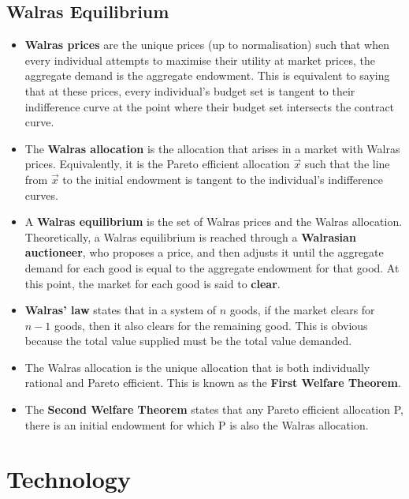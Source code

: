 \documentclass[a4paper]{article}
\begin{document}
\subsection{Walras Equilibrium}
\begin{itemize}
    \item \textbf{Walras prices} are the unique prices (up to normalisation) such that when every individual attempts to maximise their utility at market prices, the aggregate demand is the aggregate endowment. This is equivalent to saying that at these prices, every individual's budget set is tangent to their indifference curve at the point where their budget set intersects the contract curve.
    \item The \textbf{Walras allocation} is the allocation that arises in a market with Walras prices. Equivalently, it is the Pareto efficient allocation $\vec{x}$ such that the line from $\vec{x}$ to the initial endowment is tangent to the individual's indifference curves.
    \item A \textbf{Walras equilibrium} is the set of Walras prices and the Walras allocation. Theoretically, a Walras equilibrium is reached through a \textbf{Walrasian auctioneer}, who proposes a price, and then adjusts it until the aggregate demand for each good is equal to the aggregate endowment for that good. At this point, the market for each good is said to \textbf{clear}.
    \item \textbf{Walras' law} states that in a system of $n$ goods, if the market clears for $n-1$ goods, then it also clears for the remaining good. This is obvious because the total value supplied must be the total value demanded. 
    \item The Walras allocation is the unique allocation that is both individually rational and Pareto efficient. This is known as the \textbf{First Welfare Theorem}.
    \item The \textbf{Second Welfare Theorem} states that any Pareto efficient allocation P, there is an initial endowment for which P is also the Walras allocation.
\end{itemize}

\section{Technology}
\end{document}
